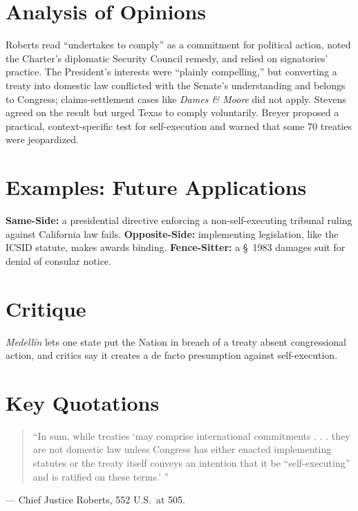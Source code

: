\documentclass[12pt]{article}
\begin{document}
\section{Analysis of Opinions}
Roberts read ``undertakes to comply'' as a commitment for political action, noted the Charter's diplomatic Security Council remedy, and relied on signatories' practice. The President's interests were ``plainly compelling,'' but converting a treaty into domestic law conflicted with the Senate's understanding and belongs to Congress; claims-settlement cases like \textit{Dames \& Moore} did not apply. Stevens agreed on the result but urged Texas to comply voluntarily. Breyer proposed a practical, context-specific test for self-execution and warned that some 70 treaties were jeopardized.

\section{Examples: Future Applications}
\textbf{Same-Side:} a presidential directive enforcing a non-self-executing tribunal ruling against California law fails. \textbf{Opposite-Side:} implementing legislation, like the ICSID statute, makes awards binding. \textbf{Fence-Sitter:} a \S\ 1983 damages suit for denial of consular notice.

\section{Critique}
\textit{Medell\'{i}n} lets one state put the Nation in breach of a treaty absent congressional action, and critics say it creates a de facto presumption against self-execution.

\section{Key Quotations}
\begin{quote}
``In sum, while treaties `may comprise international commitments . . . they are not domestic law unless Congress has either enacted implementing statutes or the treaty itself conveys an intention that it be ``self-executing'' and is ratified on these terms.' ''
\end{quote}
\noindent --- Chief Justice Roberts, 552 U.S.\ at 505.
\end{document}
